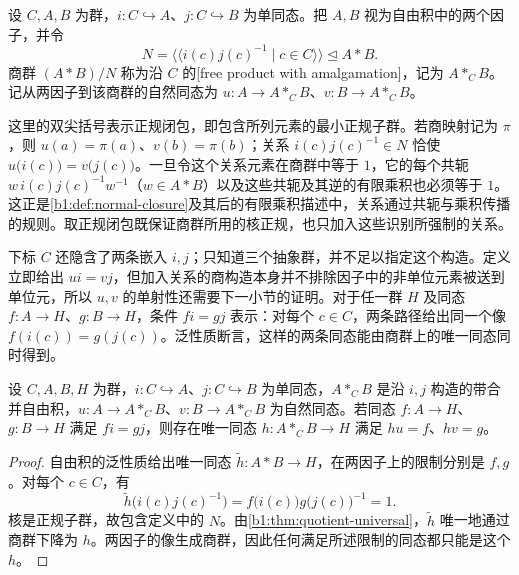 \begin{definition}\label{b1:def:amalgamated-free-product}
	设 \(C,A,B\) 为群，\(i:C\hookrightarrow A\)、\(j:C\hookrightarrow B\) 为单同态。把 \(A,B\) 视为自由积中的两个因子，并令
	\[
		N=\bigl\langle\!\bigl\langle i(c)j(c)^{-1}\mid c\in C\bigr\rangle\!\bigr\rangle \trianglelefteq A*B.
	\]
	商群 \((A*B)/N\) 称为沿 \(C\) 的[free product with amalgamation]，记为 \(A*_C B\)。记从两因子到该商群的自然同态为 \(u:A\rightarrow A*_C B\)、\(v:B\rightarrow A*_C B\)。
\end{definition}


这里的双尖括号表示正规闭包，即包含所列元素的最小正规子群。若商映射记为 \(\pi\)，则 \(u(a)=\pi(a)\)、\(v(b)=\pi(b)\)；关系 \(i(c)j(c)^{-1}\in N\) 恰使 \(u\bigl(i(c)\bigr)=v\bigl(j(c)\bigr)\)。一旦令这个关系元素在商群中等于 \(1\)，它的每个共轭 \(w\,i(c)j(c)^{-1}w^{-1}\)（\(w\in A*B\)）以及这些共轭及其逆的有限乘积也必须等于 \(1\)。这正是\cref{b1:def:normal-closure}及其后的有限乘积描述中，关系通过共轭与乘积传播的规则。取正规闭包既保证商群所用的核正规，也只加入这些识别所强制的关系。

\ProseParagraphBreak
下标 \(C\) 还隐含了两条嵌入 \(i,j\)；只知道三个抽象群，并不足以指定这个构造。定义立即给出 \(ui=vj\)，但加入关系的商构造本身并不排除因子中的非单位元素被送到单位元，所以 \(u,v\) 的单射性还需要下一小节的证明。对于任一群 \(H\) 及同态 \(f:A\to H\)、\(g:B\to H\)，条件 \(fi=gj\) 表示：对每个 \(c\in C\)，两条路径给出同一个像 \(f(i(c))=g(j(c))\)。泛性质断言，这样的两条同态能由商群上的唯一同态同时得到。

\begin{proposition}\label{b1:prop:amalgam-universal}
	设 \(C,A,B,H\) 为群，\(i:C\hookrightarrow A\)、\(j:C\hookrightarrow B\) 为单同态，\(A*_C B\) 是沿 \(i,j\) 构造的带合并自由积，\(u:A\rightarrow A*_C B\)、\(v:B\rightarrow A*_C B\) 为自然同态。若同态 \(f:A\rightarrow H\)、\(g:B\rightarrow H\) 满足 \(fi=gj\)，则存在唯一同态 \(h:A*_C B\rightarrow H\) 满足 \(hu=f\)、\(hv=g\)。
\end{proposition}

\begin{proof}
	自由积的泛性质给出唯一同态 \(\widetilde h:A*B\rightarrow H\)，在两因子上的限制分别是 \(f,g\)。对每个 \(c\in C\)，有
	\[
		\widetilde h\bigl(i(c)j(c)^{-1}\bigr) =f\bigl(i(c)\bigr)g\bigl(j(c)\bigr)^{-1}=1.
	\]
	核是正规子群，故包含定义中的 \(N\)。由\cref{b1:thm:quotient-universal}，\(\widetilde h\) 唯一地通过商群下降为 \(h\)。两因子的像生成商群，因此任何满足所述限制的同态都只能是这个 \(h\)。
\end{proof}

